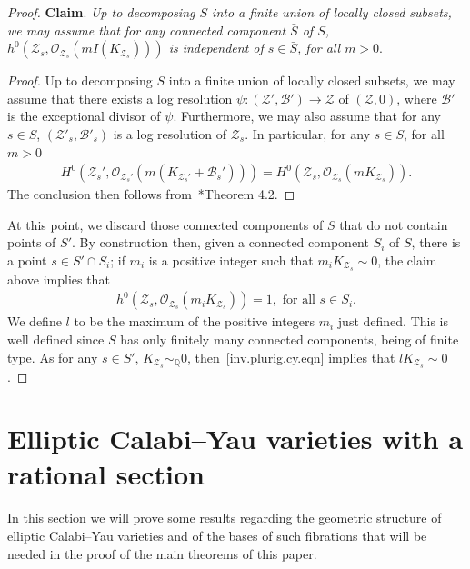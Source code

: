 \documentclass[11pt]{ip-journal}
\theoremstyle{definition}
\begin{document}
\begin{proof}
{\bf Claim}. 
{\it Up to decomposing $S$ into a finite union of locally closed subsets, we may assume that for any  connected component $\bar{S}$ of $S$, $h^0(\mathcal{Z}_s, \mathcal{O}_{\mathcal{Z}_s}(mI(K_{\mathcal{Z}_s})))$ is independent of $s \in \bar{S}$, for all $m >0$}.
\begin{proof}
Up to decomposing $S$ into a finite union of locally closed subsets, we may assume that there exists a log resolution $\psi\colon (\mathcal{Z}', \mathcal{B}') \to \mathcal Z$ of $(\mathcal Z, 0)$, where $\mathcal{B}'$ is the exceptional divisor of $\psi$.
Furthermore, we may also assume that for any $s \in S$, $(\mathcal{Z}'_s, \mathcal{B}'_s)$ is a log resolution of $\mathcal{Z}_s$.
In particular, for any $s \in S$, for all $m > 0$
\begin{align*}
H^0(\mathcal{Z}_s', \mathcal{O}_{\mathcal{Z}_s'}(m(K_{\mathcal{Z}_s'}+\mathcal{B}_s'))) = 
H^0(\mathcal{Z}_s, \mathcal{O}_{\mathcal{Z}_s}(mK_{\mathcal{Z}_s})).
\end{align*}
The conclusion then follows from~\cite{MR3779687}*{Theorem 4.2}.
\end{proof}
\noindent
At this point, we discard those connected components of $S$ that do not contain points of $S'$.
By construction then, given a connected component $S_i$ of $S$, there is a point $s \in S'\cap S_i$; if $m_i$ is a positive integer such that $m_iK_{\mathcal{Z}_s} \sim 0$, the claim above implies that 
\begin{align}
\label{inv.plurig.cy.eqn}
h^0(\mathcal{Z}_s, \mathcal{O}_{\mathcal{Z}_s}(m_iK_{\mathcal{Z}_s}))=1, \textrm{ for all $s \in S_i$.}
\end{align} 
We define $l$ to be the maximum of the positive integers $m_i$ just defined.
This is well defined since $S$ has only finitely many connected components, being of finite type.
As for any $s \in S'$, $K_{\mathcal{Z}_s} \sim_{\mathbb{Q}} 0$, then~\eqref{inv.plurig.cy.eqn} implies that $lK_{\mathcal{Z}_s} \sim 0$.
\end{proof}



\section{Elliptic Calabi--Yau varieties with a rational section}
\label{ell.cy.sect}

In this section we will prove some results regarding the geometric structure of elliptic Calabi--Yau varieties and of the bases of such fibrations that will be needed in the proof of the main theorems of this paper.
\end{document}
